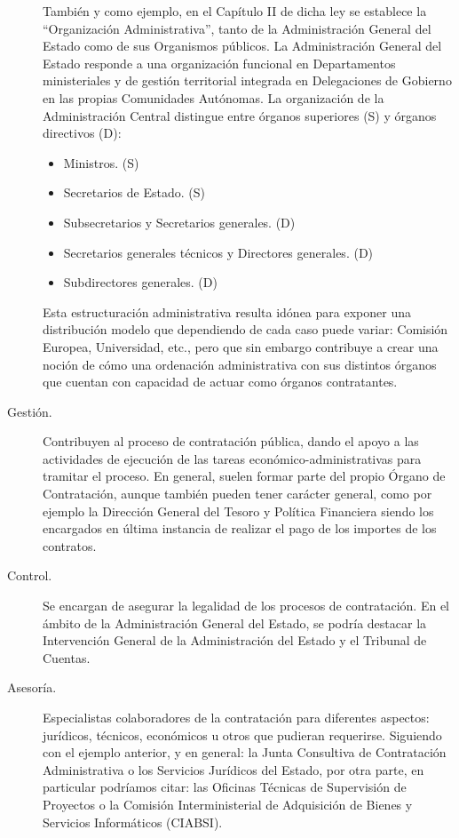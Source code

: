 \begin{description}
También y como ejemplo, en el Capítulo II de dicha ley se establece
la ``Organización Administrativa'', tanto de la Administración General del Estado como de sus Organismos públicos. La Administración 
General del Estado responde a una organización funcional en Departamentos ministeriales y de gestión
territorial integrada en Delegaciones de Gobierno en las propias
Comunidades Autónomas. La organización de la Administración Central distingue
entre órganos superiores (S) y órganos directivos (D):
\begin{itemize}
 \item Ministros. (S)
 \item Secretarios de Estado. (S)
 \item Subsecretarios y Secretarios generales. (D)
 \item Secretarios generales técnicos y Directores generales. (D)
 \item Subdirectores generales. (D)
\end{itemize}

Esta estructuración administrativa resulta idónea para exponer una distribución modelo que dependiendo de cada
caso puede variar: Comisión Europea, Universidad, etc., pero que sin embargo contribuye a crear una noción de
cómo una ordenación administrativa con sus distintos órganos que cuentan con capacidad de actuar como órganos contratantes.

\item [Gestión.] Contribuyen al proceso de contratación pública, dando el apoyo a las actividades
de ejecución de las tareas económico-administrativas para tramitar el proceso. En general, suelen formar
parte del propio Órgano de Contratación, aunque también pueden tener carácter general, como por ejemplo la 
Dirección General del Tesoro y Política Financiera siendo los encargados en última instancia de realizar el pago
de los importes de los contratos.

\item [Control.] Se encargan de asegurar la legalidad de los procesos de contratación. En el ámbito
de la Administración General del Estado, se podría destacar la Intervención General de la Administración del Estado y el
Tribunal de Cuentas.

\item [Asesoría.] Especialistas colaboradores de la contratación para diferentes aspectos: jurídicos, técnicos, económicos u 
otros que pudieran requerirse. Siguiendo con el ejemplo anterior, y en general: la Junta Consultiva de Contratación Administrativa o 
los Servicios Jurídicos del Estado, por otra parte, en particular podríamos citar: las Oficinas Técnicas de Supervisión
de Proyectos o la Comisión Interministerial de Adquisición de Bienes y Servicios Informáticos (CIABSI).



\end{description}
